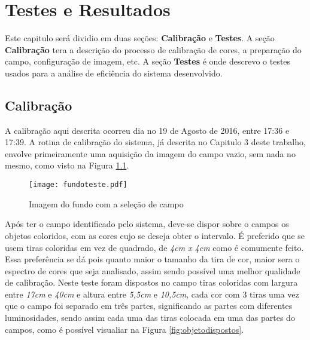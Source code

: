 % 
\chapter{Testes e Resultados} 
Este capitulo será dividio em duas seções: \textbf{Calibração} e \textbf{Testes}. A seção \textbf{Calibração} tera a descrição do processo de calibração de cores, a preparação do campo, configuração de imagem, etc. A seção \textbf{Testes} é onde descrevo o testes usados para a análise de eficiência do sistema desenvolvido.
\section{Calibração}
A calibração aqui descrita ocorreu dia no 19 de Agosto de 2016, entre 17:36 e 17:39.
A rotina de calibração do sistema, já descrita no Capitulo 3 deste trabalho, envolve primeiramente uma aquisição da imagem do campo vazio, sem nada no mesmo, como visto na Figura \ref{campovazio}.
\begin{figure}[H]
		\centering
		\texttt{[image: fundoteste.pdf]}
		\caption{Imagem do fundo com a seleção de campo}
		\label{campovazio}
	\end{figure}
Após ter o campo identificado pelo sistema, deve-se dispor sobre o campos os objetos coloridos, com as cores cujo se deseja obter o intervalo. É preferido que se usem tiras coloridas em vez de quadrado, de \textit{4cm x 4cm} como é comumente feito. Essa preferência se dá pois quanto maior o tamanho da tira de cor, maior sera o espectro de cores que seja analisado, assim sendo possível uma melhor qualidade de calibração.
Neste teste foram dispostos no campo tiras coloridas com largura entre \textit{17cm} e \textit{40cm} e altura entre \textit{5,5cm} e \textit{10,5cm}, cada cor com 3 tiras uma vez que o campo foi separado em três partes, significando as partes com diferentes luminosidades, sendo assim cada uma das tiras colocada em uma das partes do campos, como é possível visualiar na Figura \ref{fig:objetodispostos}.
	
